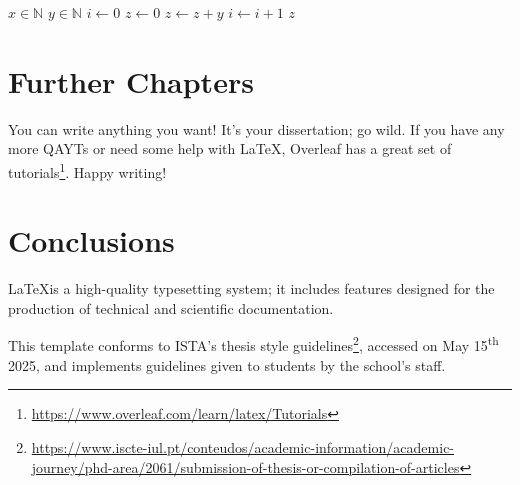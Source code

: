 \documentclass{thesis}
\begin{document}
\begin{algorithm}
    \caption{Algorithm for Multiplying Two Integers}
    \begin{algorithmic}
        \Require $x\in\mathbb{N}$
        \Require $y\in\mathbb{N}$
        \State $i \gets 0$
        \State $z \gets 0$
            \State $z \gets z + y$
            \State $i \gets i + 1$
        \EndWhile
        \State \Return $z$
    \end{algorithmic}
    \label{alg:example}
\end{algorithm}










\chapter{Further Chapters}

You can write anything you want! It's your dissertation; go wild. If you have any more \acp{QAYT} or need some help with \LaTeX, Overleaf has a great set of tutorials\footnote{\url{https://www.overleaf.com/learn/latex/Tutorials}}. Happy writing!










\chapter{Conclusions}

\LaTeX\space is a high-quality typesetting system; it includes features designed for the production of technical and scientific documentation.

This template conforms to ISTA's thesis style guidelines\footnote{\url{https://www.iscte-iul.pt/conteudos/academic-information/academic-journey/phd-area/2061/submission-of-thesis-or-compilation-of-articles}}, accessed on May 15\textsuperscript{th} 2025, and implements guidelines given to students by the school's staff.
\end{document}
